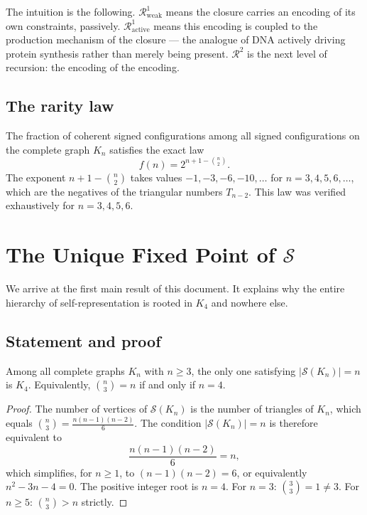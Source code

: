\documentclass[12pt,a4paper]{article}
\newenvironment{theorembox}[1][]{%
  \begin{tcolorbox}[theoremstyle,title={Theorem%
    \ifx\relax#1\relax\else: #1\fi}]}{\end{tcolorbox}}
\newenvironment{computedresult}[1][]{%
  \begin{tcolorbox}[computedstyle,title={Computational Result%
    \ifx\relax#1\relax\else: #1\fi}]}{\end{tcolorbox}}
\theoremstyle{plain}
\theoremstyle{definition}
\theoremstyle{remark}
\newcommand{\Kfour}{K_4}
\newcommand{\Sop}{\mathcal{S}}
\newcommand{\Rop}{\mathcal{R}}
\begin{document}
The intuition is the following. $\Rop^1_{\mathrm{weak}}$ means the closure carries an
encoding of its own constraints, passively. $\Rop^1_{\mathrm{active}}$ means this
encoding is coupled to the production mechanism of the closure --- the analogue of DNA
actively driving protein synthesis rather than merely being present. $\Rop^2$ is the
next level of recursion: the encoding of the encoding.

\subsection{The rarity law}

\begin{computedresult}[Rarity law --- DL01, Script~3]
\label{thm:rarity}
The fraction of coherent signed configurations among all signed configurations on the
complete graph $K_n$ satisfies the exact law
\begin{equation}
f(n) = 2^{n+1-\binom{n}{2}}.
\label{eq:rarity}
\end{equation}
The exponent $n+1-\binom{n}{2}$ takes values $-1, -3, -6, -10, \ldots$ for
$n = 3, 4, 5, 6, \ldots$, which are the negatives of the triangular numbers
$T_{n-2}$. This law was verified exhaustively for $n = 3, 4, 5, 6$.
\end{computedresult}

\section{The Unique Fixed Point of \texorpdfstring{$\Sop$}{S}}
\label{sec:fixedpoint}

We arrive at the first main result of this document. It explains why the entire
hierarchy of self-representation is rooted in $\Kfour$ and nowhere else.

\subsection{Statement and proof}

\begin{theorembox}[Unique fixed point of $\Sop$]
\label{thm:fixedpoint}
Among all complete graphs $K_n$ with $n \geq 3$, the only one satisfying
$|\Sop(K_n)| = n$ is $K_4$. Equivalently, $\binom{n}{3} = n$ if and only if $n = 4$.
\end{theorembox}

\begin{proof}
The number of vertices of $\Sop(K_n)$ is the number of triangles of $K_n$, which
equals $\binom{n}{3} = \frac{n(n-1)(n-2)}{6}$. The condition $|\Sop(K_n)| = n$ is
therefore equivalent to
\begin{equation}
\frac{n(n-1)(n-2)}{6} = n,
\end{equation}
which simplifies, for $n \geq 1$, to $(n-1)(n-2) = 6$, or equivalently $n^2 - 3n -
4 = 0$. The positive integer root is $n = 4$. For $n = 3$: $\binom{3}{3} = 1 \neq 3$.
For $n \geq 5$: $\binom{n}{3} > n$ strictly.
\end{proof}
\end{document}
